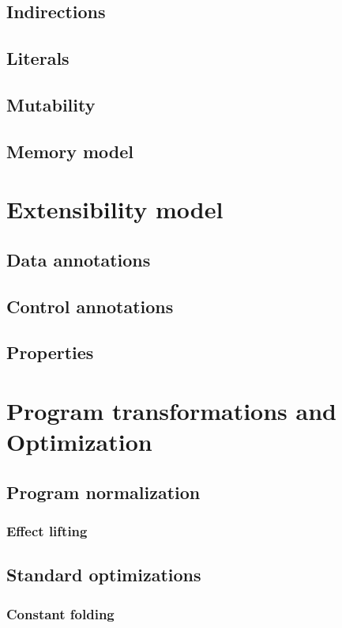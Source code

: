 \documentclass[10pt]{article}
\begin{document}
  \subsection{Indirections}
  \subsection{Literals}
  \subsection{Mutability}
  \subsection{Memory model}

\section{Extensibility model}
  \subsection{Data annotations}
  \subsection{Control annotations}
  \subsection{Properties}

\section{Program transformations and Optimization}
  \subsection{Program normalization}
    \subsubsection{Effect lifting}

  \subsection{Standard optimizations}
    \subsubsection{Constant folding}
\end{document}

